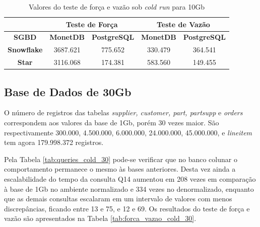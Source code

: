 \begin{table}[htpb]
        \centering
        \caption{Valores do teste de força e vazão sob \textit{cold run} para 10Gb}
        \label{tab:forca_vazao_cold_10}
        \begin{tabular}{|c|c|c|c|c|}
        \hline
                                & \multicolumn{2}{c|}{\textbf{Teste de Força}} & \multicolumn{2}{c|}{\textbf{Teste de Vazão}} \\ \hline
        \textbf{SGBD}      & \textbf{MonetDB}    & \textbf{PostgreSQL}    & \textbf{MonetDB}    & \textbf{PostgreSQL}    \\ \hline
        \textbf{Snowflake} & 3687.621            & 775.652                & 330.479             & 364.541                \\ \hline
        \textbf{Star}      & 3116.068            & 174.381                & 583.560             & 149.455                \\ \hline
        \end{tabular}
\end{table}


\subsection{Base de Dados de 30Gb}

O número de registros das tabelas \textit{supplier, customer, part, partsupp} e \textit{orders} correspondem aos valores da base de 1Gb, porém 30 vezes maior. São respectivamente 300.000, 4.500.000, 6.000.000, 24.000.000, 45.000.000, e \textit{lineitem} tem agora 179.998.372 registros.

Pela Tabela \ref{tab:queries_cold_30} pode-se verificar que no banco colunar o comportamento permanece o mesmo às bases anteriores. Desta vez ainda a escalabilidade do tempo da consulta Q14 aumentou em 208 vezes em comparação à base de 1Gb no ambiente normalizado e 334 vezes no denormalizado, enquanto que as demais consultas escalaram em um intervalo de valores com menos discrepâncias, ficando entre 13 e 75, e 12 e 69. Os resultados do teste de força e vazão são apresentados na Tabela \ref{tab:forca_vazao_cold_30}.

